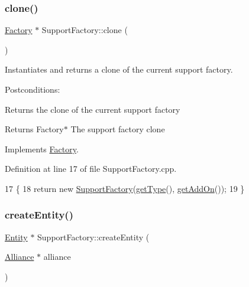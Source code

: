 \subsubsection{\texorpdfstring{clone()}{clone()}}
{\footnotesize\ttfamily \hyperlink{classFactory}{Factory} $\ast$ Support\+Factory\+::clone (\begin{DoxyParamCaption}{ }\end{DoxyParamCaption})\hspace{0.3cm}{\ttfamily [virtual]}}



Instantiates and returns a clone of the current support factory. 

Postconditions\+:
\begin{DoxyItemize}
\item Returns the clone of the current support factory
\end{DoxyItemize}

\begin{DoxyReturn}{Returns}
Factory$\ast$ The support factory clone 
\end{DoxyReturn}


Implements \hyperlink{classFactory}{Factory}.



Definition at line 17 of file Support\+Factory.\+cpp.


\begin{DoxyCode}
17                                \{
18     \textcolor{keywordflow}{return} \textcolor{keyword}{new} \hyperlink{classSupportFactory_a8e0b10fb625f7d4a93cec9989bef45c4}{SupportFactory}(\hyperlink{classFactory_ac91051006ace7ec5bb6ecf0fe6d02d58}{getType}(), \hyperlink{classFactory_a994153930f59cafb280e91d5b100b5aa}{getAddOn}());
19 \}
\end{DoxyCode}
\mbox{\label{classSupportFactory_ad2ebc8fdf1335e423a766fa0c5573cf8}} 
\subsubsection{\texorpdfstring{create\+Entity()}{createEntity()}}
{\footnotesize\ttfamily \hyperlink{classEntity}{Entity} $\ast$ Support\+Factory\+::create\+Entity (\begin{DoxyParamCaption}\item[{\hyperlink{classAlliance}{Alliance} $\ast$}]{alliance }\end{DoxyParamCaption})\hspace{0.3cm}{\ttfamily [virtual]}}



